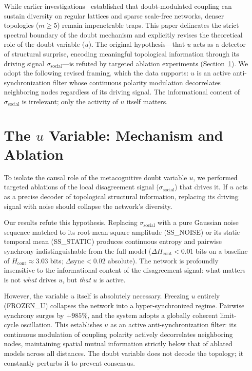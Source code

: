 \documentclass[11pt,a4paper]{article}
\begin{document}
While earlier investigations~\cite{mem4ristor2026} established that doubt-modulated coupling can sustain diversity on regular lattices and sparse scale-free networks, denser topologies ($m \geq 5$) remain impenetrable traps. This paper delineates the strict spectral boundary of the doubt mechanism and explicitly revises the theoretical role of the doubt variable ($u$). The original hypothesis---that $u$ acts as a detector of structural surprise, encoding meaningful topological information through its driving signal $\sigma_{\mathrm{social}}$---is refuted by targeted ablation experiments (Section~\ref{sec:mechanism}). We adopt the following revised framing, which the data supports: $u$ is an active anti-synchronization filter whose continuous polarity modulation decorrelates neighboring nodes regardless of its driving signal. The informational content of $\sigma_{\mathrm{social}}$ is irrelevant; only the activity of $u$ itself matters.

\section{The $u$ Variable: Mechanism and Ablation}
\label{sec:mechanism}
To isolate the causal role of the metacognitive doubt variable $u$, we performed targeted ablations of the local disagreement signal ($\sigma_{\mathrm{social}}$) that drives it. If $u$ acts as a precise decoder of topological structural information, replacing its driving signal with noise should collapse the network's diversity.

Our results refute this hypothesis. Replacing $\sigma_{\mathrm{social}}$ with a pure Gaussian noise sequence matched to its root-mean-square amplitude (\textsc{SS\_NOISE}) or its static temporal mean (\textsc{SS\_STATIC}) produces continuous entropy and pairwise synchrony indistinguishable from the full model ($\Delta H_{\mathrm{cont}} < 0.01$ bits on a baseline of $H_{\mathrm{cont}} \approx 3.03$ bits; $\Delta\mathrm{sync} < 0.02$ absolute). The network is profoundly insensitive to the informational content of the disagreement signal: what matters is not \emph{what} drives $u$, but \emph{that} $u$ is active.

However, the variable $u$ itself is absolutely necessary. Freezing $u$ entirely (\textsc{FROZEN\_U}) collapses the network into a hyper-synchronized regime. Pairwise synchrony surges by $+985\%$, and the system adopts a globally coherent limit-cycle oscillation. This establishes $u$ as an active anti-synchronization filter: its continuous modulation of coupling polarity actively decorrelates neighboring nodes, maintaining spatial mutual information strictly below that of ablated models across all distances. The doubt variable does not decode the topology; it constantly perturbs it to prevent consensus.
\end{document}
